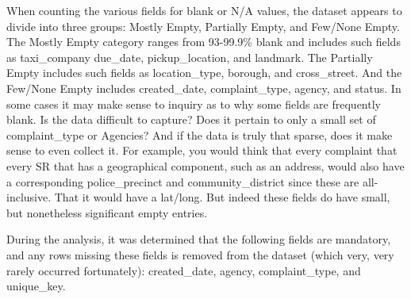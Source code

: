 \documentclass[12pt, titlepage]{article}
\begin{document}
When counting the various fields for blank or N/A values, the dataset appears to divide into three groups: Mostly Empty, Partially Empty, and Few/None Empty.
The Mostly Empty category ranges from 93-99.9\% blank and includes such fields as taxi\_company due\_date, pickup\_location, and landmark. The Partially 
Empty includes such fields as location\_type, borough, and cross\_street. And the Few/None Empty includes created\_date, complaint\_type, agency, and status.
In some cases it may make sense to inquiry as to why some fields are frequently blank. Is the data difficult to capture? Does it pertain to only a small set
of complaint\_type or Agencies? And if the data is truly that sparse, does it make sense to even collect it. For example, you would think that every complaint
that every SR that has a geographical component, such as an address, would also have a corresponding police\_precinct and community\_district since these
are all-inclusive. That it would have a lat/long.  But indeed these fields do have small, but nonetheless significant empty entries. 

During the analysis, it was determined that the following fields are mandatory, and any rows missing these fields is removed from the dataset (which very, very
rarely occurred fortunately): created\_date, agency, complaint\_type, and unique\_key. 
\end{document}
